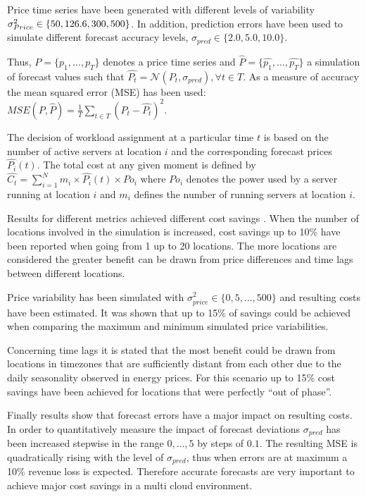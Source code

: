 Price time series have been generated with different levels of variability $\sigma_{Price}^{2} \in \{50, 126.6, \allowbreak 300, 500\}$. In addition, prediction errors have been used to simulate different forecast accuracy levels, $\sigma_{pred} \in \{2.0, 5.0, 10.0\}$. 

Thus, $P = \{p_1,\ldots,p_T \}$ denotes a price time series and $\hat{P} = \{\hat{p_1},\ldots,\hat{p_T}\}$ a simulation of forecast values such that 
$\hat{P_t} = \mathcal{N}(P_t, \sigma_{pred}), \forall t \in T$. As a measure of accuracy the mean squared error (MSE) has been used: 
$MSE(P,\hat{P}) = \frac{1}{T} \sum_{t \in T}{(P_t - \hat{P_t})^2}$. 

The decision of workload assignment at a particular time $t$ is based on the number of active servers at location $i$ and the corresponding forecast prices $\hat{P_i}(t)$. The total cost at any given moment is defined by $\hat{C_t} = \sum_{i=1}^{N}{m_i \times \hat{P_i}(t) \times Po_i}$ where $Po_i$ denotes the power used by a server running at location $i$ and $m_i$ defines the number of running servers at location $i$. 

Results for different metrics achieved different cost savings \cite{de2013study}. When the number of locations involved in the simulation is increased, cost savings up to 10\% have been reported when going from 1 up to 20 locations. The more locations are considered the greater benefit can be drawn from price differences and time lags between different locations. 

Price variability has been simulated with $\sigma_{price}^{2} \in \{0,5,\ldots,500\}$ and resulting costs have been estimated. It was shown that up to 15\% of savings could be achieved when comparing the maximum and minimum simulated price variabilities. 

Concerning time lags it is stated that the most benefit could be drawn from locations in timezones that are sufficiently distant from each other due to the daily seasonality observed in energy prices. For this scenario up to 15\% cost savings have been achieved for locations that were perfectly "`out of phase"'. 

Finally results show that forecast errors have a major impact on resulting costs. In order to quantitatively measure the impact of forecast deviations $\sigma_{pred}$ has been increased stepwise in the range $0,\ldots,5$ by steps of $0.1$.
The resulting MSE is quadratically rising with the level of $\sigma_{pred}$, thus when errors are at maximum a 10\% revenue loss is expected. 
Therefore accurate forecasts are very important to achieve major cost savings in a multi cloud environment. 




